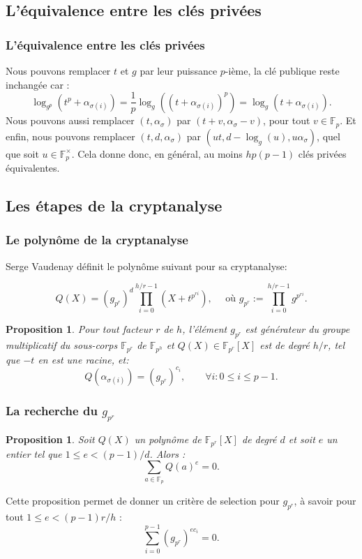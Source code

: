 \documentclass{beamer}
\newtheorem{prop}[theo]{Proposition}
\theoremstyle{definition}
\theoremstyle{remark}
\def\gf #1{\mathbb{F}_{#1}}
\begin{document}
\subsection{L'équivalence entre les clés privées}
\begin{frame}
	\frametitle{L'équivalence entre les clés privées}
Nous pouvons remplacer $t$ et $g$ par leur puissance $p$-ième, la clé publique reste inchangée car :
$$\log_{g^p}\left(t^p + \alpha_{\sigma(i)}\right) = \frac{1}{p}\log_{g}\left(\left(t + \alpha_{\sigma(i)}\right)^p\right) = \log_{g}\left(t + \alpha_{\sigma(i)}\right).$$
Nous pouvons aussi remplacer $(t, \alpha_{\sigma})$ par $(t + v, \alpha_{\sigma} - v)$, pour tout $v \in \gf{p}$. Et enfin, nous pouvons remplacer $(t,d,\alpha_\sigma)$ par $(ut, d - \log_g(u), u\alpha_\sigma)$, quel que soit $u \in \gf{p}^\times$.
Cela donne donc, en général, au moins $hp(p-1)$ clés privées équivalentes.
\end{frame}

\subsection{Les étapes de la cryptanalyse}
\begin{frame}
	\frametitle{Le polynôme de la cryptanalyse}
        Serge Vaudenay définit le polynôme suivant pour sa cryptanalyse:

$$Q(X) = (g_{p^r})^{d} \prod_{i=0}^{h/r-1} \left(X+t^{p^{ri}}\right), \quad \text{ où } g_{p^r} := \prod_{i=0}^{h/r-1} g^{p^{ri}}.$$
        \begin{prop}
Pour tout facteur $r$ de $h$, l'élément $g_{p^r}$ est générateur du groupe multiplicatif du sous-corps $\gf{p^r}$ de $\gf{p^h}$ et $Q(X) \in \gf{p^r}[X]$ est de degré $h/r$, tel que $-t$ en est une racine, et:
$$Q\left(\alpha_{\sigma(i)}\right) = (g_{p^r})^{c_i},\qquad \forall i : 0\leqslant i \leqslant p-1.$$
\end{prop}
\end{frame}

\begin{frame}
  \frametitle{La recherche du $g_{p^r}$}
  \begin{prop}
Soit $Q(X)$ un polynôme de $\gf{p^r}[X]$ de degré $d$ et soit $e$ un entier tel que $1 \leqslant e < (p-1)/d$. Alors : $$\sum_{a \in \gf{p}} Q(a)^e = 0.$$
\end{prop}
Cette proposition permet de donner un critère de selection pour $g_{p^r}$, à savoir pour tout $1 \leqslant e < (p-1)r/h$ :
$$\sum_{i=0}^{p-1} (g_{p^r})^{ec_i} = 0.$$
\end{frame}
\end{document}
